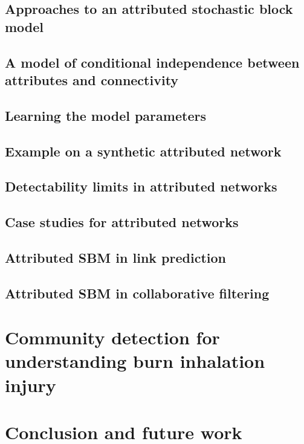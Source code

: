 \section{Approaches to an attributed stochastic block model}
\section{A model of conditional independence between attributes and connectivity}
\section{Learning the model parameters}
\section{Example on a synthetic attributed network}
\section{Detectability limits in attributed networks}
\section{Case studies for attributed networks}
\section{Attributed SBM in link prediction}
\section{Attributed SBM in collaborative filtering}

\chapter{Community detection for understanding burn inhalation injury}


\chapter{Conclusion and future work}





